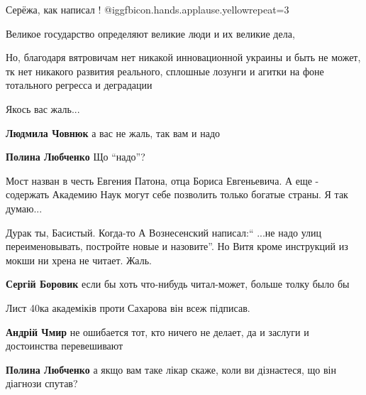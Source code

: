  
 
 
 
 
\zzSecCmt

\begin{itemize} %
Серёжа, как написал ! @igg{fbicon.hands.applause.yellow}{repeat=3} 

Великое государство определяют великие люди и их великие дела,

Но, благодаря вятровичам нет никакой инновационной украины и быть не может, тк
нет никакого развития реального, сплошные лозунги и агитки на фоне тотального
регресса и деградации

\begin{itemize} %
Якось вас жаль...

\textbf{Людмила Човнюк} а вас не жаль, так вам и надо

\textbf{Полина Любченко} Що \enquote{надо}?


Мост назван в честь Евгения Патона, отца Бориса Евгеньевича. А еще - содержать
Академию Наук могут себе позволить только богатые страны. Я так думаю...

\end{itemize} %


Дурак ты, Басистый. Когда-то А Вознесенский написал:\enquote{ ...не надо улиц
переименовывать, постройте новые и назовите}. Но Витя кроме инструкций из мокши
ни хрена не читает. Жаль.


\textbf{Сергій Боровик} если бы хоть что-нибудь читал-может, больше толку было бы

Лист 40ка академіків проти Сахарова він всеж підписав.

\begin{itemize} %
\textbf{Андрій Чмир} не ошибается тот, кто ничего не делает, да и заслуги и достоинства перевешивают

\begin{itemize} %
\textbf{Полина Любченко} а якщо вам таке лікар скаже, коли ви дізнаєтеся, що він діагнози спутав?


\end{itemize}
\end{itemize}
\end{itemize}
